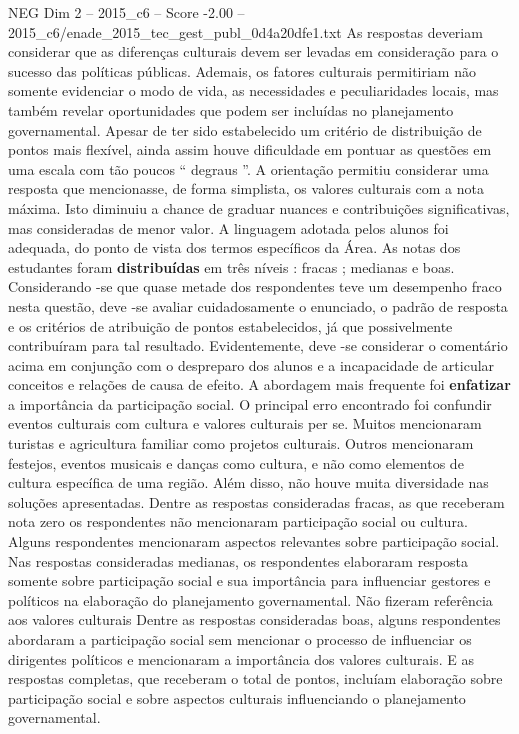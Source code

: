 \begin{textsample}{NEG Dim 2 – 2015\_c6 – Score -2.00 – 2015\_c6/enade\_2015\_tec\_gest\_publ\_0d4a20dfe1.txt}
As respostas deveriam considerar que as diferenças culturais devem ser levadas em consideração para o sucesso das políticas públicas.
Ademais, os fatores culturais permitiriam não somente evidenciar o modo de vida, as necessidades e peculiaridades locais, mas também revelar oportunidades que podem ser incluídas no planejamento governamental.
Apesar de ter sido estabelecido um critério de distribuição de pontos mais flexível, ainda assim houve dificuldade em pontuar as questões em uma escala com tão poucos “ degraus ”.
A orientação permitiu considerar uma resposta que mencionasse, de forma simplista, os valores culturais com a nota máxima.
Isto diminuiu a chance de graduar nuances e contribuições significativas, mas consideradas de menor valor.
A linguagem adotada pelos alunos foi adequada, do ponto de vista dos termos específicos da Área.
As notas dos estudantes foram \textbf{distribuídas} em três níveis : fracas ; medianas e boas.
Considerando -se que quase metade dos respondentes teve um desempenho fraco nesta questão, deve -se avaliar cuidadosamente o enunciado, o padrão de resposta e os critérios de atribuição de pontos estabelecidos, já que possivelmente contribuíram para tal resultado.
Evidentemente, deve -se considerar o comentário acima em conjunção com o despreparo dos alunos e a incapacidade de articular conceitos e relações de causa de efeito.
A abordagem mais frequente foi \textbf{enfatizar} a importância da participação social.
O principal erro encontrado foi confundir eventos culturais com cultura e valores culturais per se.
Muitos mencionaram turistas e agricultura familiar como projetos culturais.
Outros mencionaram festejos, eventos musicais e danças como cultura, e não como elementos de cultura específica de uma região.
Além disso, não houve muita diversidade nas soluções apresentadas.
Dentre as respostas consideradas fracas, as que receberam nota zero os respondentes não mencionaram participação social ou cultura.
Alguns respondentes mencionaram aspectos relevantes sobre participação social.
Nas respostas consideradas medianas, os respondentes elaboraram resposta somente sobre participação social e sua importância para influenciar gestores e políticos na elaboração do planejamento governamental.
Não fizeram referência aos valores culturais Dentre as respostas consideradas boas, alguns respondentes abordaram a participação social sem mencionar o processo de influenciar os dirigentes políticos e mencionaram a importância dos valores culturais.
E as respostas completas, que receberam o total de pontos, incluíam elaboração sobre participação social e sobre aspectos culturais influenciando o planejamento governamental.

\end{textsample}
